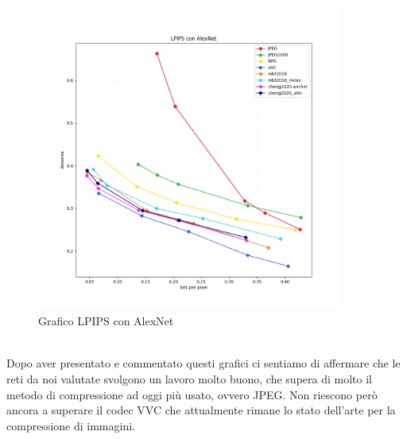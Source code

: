 \begin{figure}[!h]
    \centering
    \includegraphics[width=0.9\textwidth]{Immagini/METRICS/LPIPS.png}
    \caption{Grafico LPIPS con AlexNet}
    \label{fig:LPIPSGraph}
\end{figure}\\
Dopo aver presentato e commentato questi grafici ci sentiamo di affermare che le reti da noi valutate svolgono un lavoro molto buono, che supera di molto il metodo di compressione ad oggi più usato, ovvero JPEG. Non riescono però ancora a superare il codec VVC che attualmente rimane lo stato dell’arte per la compressione di immagini.\\
